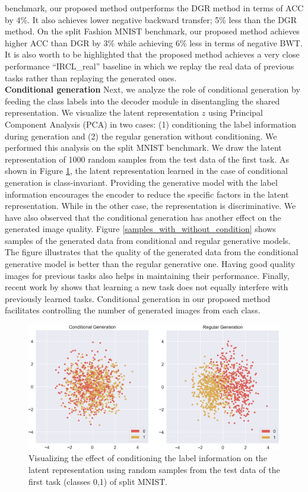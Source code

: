 \documentclass[letterpaper]{article} %
\begin{document}
benchmark, our proposed method outperforms the DGR method in terms of ACC by 4\%. It also achieves lower negative backward transfer; 5\% less than the DGR method. On the split Fashion MNIST benchmark, our proposed method achieves higher ACC than DGR by 3\% while achieving 6\% less in terms of negative BWT. It is also worth to be highlighted that the proposed method achieves a very close performance \enquote{IRCL\_real} baseline in which we replay the real data of previous tasks rather than replaying the generated ones.\\

\textbf{Conditional generation} Next, we analyze the role of conditional generation by feeding the class labels into the decoder module in disentangling the shared representation. We visualize the latent representation $z$ using Principal Component Analysis (PCA) \cite{wold1987principal} in two cases: (1) conditioning the label information during generation and (2) the regular generation without conditioning. We performed this analysis on the split MNIST benchmark. We draw the latent representation of 1000 random samples from the test data of the first task. As shown in Figure \ref{z_with_conditioning}, the latent representation learned in the case of conditional generation is class-invariant. Providing the generative model with the label information encourages the encoder to reduce the specific factors in the latent representation. While in the other case, the representation is discriminative. We have also observed that the conditional generation has another effect on the generated image quality. Figure \ref{samples_with_without_condition} shows samples of the generated data from conditional and regular generative models. The figure illustrates that the quality of the generated data from the conditional generative model is better than the regular generative one. Having good quality images for previous tasks also helps in maintaining their performance.  Finally, recent work by \cite{aljundi2019online} shows that learning a new task does not equally interfere with previously learned tasks. Conditional generation in our proposed method facilitates controlling the number of generated images from each class.\\
\begin{figure}[ht]
\centering
\includegraphics[width=\columnwidth]{pic/conditioningvsnotconditioning.png}
\caption{Visualizing the effect of conditioning the label information on the latent representation using random samples from the test data of the first task (classes 0,1) of split MNIST.}
\label{z_with_conditioning}
\end{figure}
\end{document}
